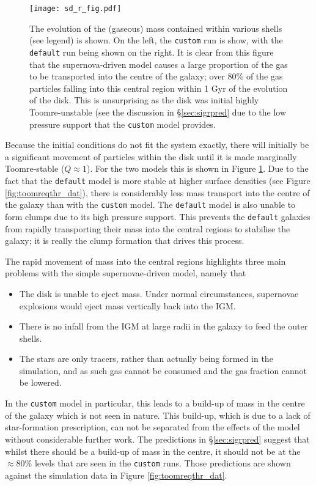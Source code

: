 \begin{figure}[!ht]
    \centering
    \texttt{[image: sd\_r\_fig.pdf]}
    \caption{The evolution of the (gaseous) mass contained within various shells (see legend) is shown. On the left, the {\tt custom} run is show, with the {\tt default} run being shown on the right. It is clear from this figure that the supernova-driven model causes a large proportion of the gas to be transported into the centre of the galaxy; over 80\% of the gas particles falling into this central region within 1 Gyr of the evolution of the disk. This is unsurprising as the disk was initial highly Toomre-unstable (see the discussion in \S \ref{sec:sigrpred} due to the low pressure support that the {\tt custom} model provides.}
    \label{fig:sd_r_evo}
\end{figure}
Because the initial conditions do not fit the system exactly, there will initially be a significant movement of particles within the disk until it is made marginally Toomre-stable ($Q\approx1$).
For the two models this is shown in Figure \ref{fig:sd_r_evo}.
Due to the fact that the {\tt default} model is more stable at higher surface densities (see Figure \ref{fig:toomreqthr_dat}), there is considerably less mass transport into the centre of the galaxy than with the {\tt custom} model.
The {\tt default} model is also unable to form clumps due to its high pressure support.
This prevents the {\tt default} galaxies from rapidly transporting their mass into the central regions to stabilise the galaxy; it is really the clump formation that drives this process. 

The rapid movement of mass into the central regions highlights three main problems with the simple supernovae-driven model, namely that
\begin{itemize}
    \item The disk is unable to eject mass. Under normal circumstances, supernovae explosions would eject mass vertically back into the IGM.
    \item There is no infall from the IGM at large radii in the galaxy to feed the outer shells.
    \item The stars are only tracers, rather than actually being formed in the simulation, and as such gas cannot be consumed and the gas fraction cannot be lowered.
\end{itemize}
In the {\tt custom} model in particular, this leads to a build-up of mass in the centre of the galaxy which is not seen in nature.
This build-up, which is due to a lack of star-formation prescription, can not be separated from the effects of the model without considerable further work.
The predictions in \S \ref{sec:sigrpred} suggest that whilst there should be a build-up of mass in the centre, it should not be at the $\approx 80\%$ levels that are seen in the {\tt custom} runs.
Those predictions are shown against the simulation data in Figure \ref{fig:toomreqthr_dat}.


